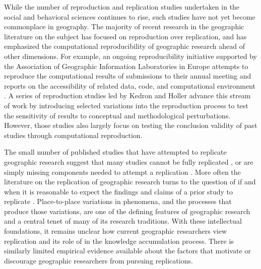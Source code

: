 \documentclass[]{interact}
\theoremstyle{plain}%
\theoremstyle{definition}
\theoremstyle{remark}
\begin{document}
While the number of reproduction and replication studies undertaken in the social and behavioral sciences continues to rise, such studies have not yet become commonplace in geography.
The majority of recent research in the geographic literature on the subject has focused on reproduction over replication, and has emphasized the computational reproducibility of geographic research ahead of other dimensions.
For example, an ongoing reproducibility initiative supported by the Association of Geographic Information Laboratories in Europe attempts to reproduce the computational results of submissions to their annual meeting and reports on the accessibility of related data, code, and computational environment \citep{nust2018, ostermann2021}.
A series of reproduction studies led by Kedron and Holler \citep{Kedron2023Beyond, Kedron_Holler_Bardin_Hilgendorf_2022} advance this stream of work by introducing selected variations into the reproduction process to test the sensitivity of results to conceptual and methodological perturbations. 
However, those studies also largely focus on testing the conclusion validity of past studies through computational reproduction. 

The small number of published studies that have attempted to replicate geographic research suggest that many studies cannot be fully replicated \citep[e.g.,][]{Kedron2022dimaggio, paez2022reproducibility}, or are simply missing components needed to attempt a replication \citep{konkol2019, ostermann2017}.
More often the literature on the replication of geographic research turns to the question of if and when it is reasonable to expect the findings and claims of a prior study to replicate \citep{kedron2021GA, kedron2022replication, goodchild2021replication, sui2021reproducibility}. 
Place-to-place variations in phenomena, and the processes that produce those variations, are one of the defining features of geographic research and a central tenet of many of its research traditions.
With these intellectual foundations, it remains unclear how current geographic researchers view replication and its role of in the knowledge accumulation process.
There is similarly limited empirical evidence available about the factors that motivate or discourage geographic researchers from pursuing replications. 
\end{document}
